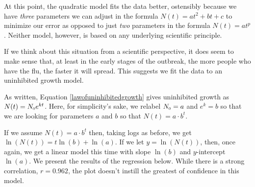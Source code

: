 \documentclass{ximera}
\begin{document}
\smallskip

At this point, the quadratic model fits the data better, ostensibly because we have \textit{three} parameters we can adjust in the formula $N(t) = at^2+bt+c$ to minimize our error as opposed to just \textit{two} parameters in the formula $N(t) = a t^{p}$.  Neither  model, however, is based on any underlying scientific principle.

\smallskip

If we think about this situation from a scientific perspective, it does seem to make sense that, at least in the early stages of the outbreak, the more people who have the flu, the faster it will spread.  This suggests we fit the data to an uninhibited growth model.

\smallskip

As  written,  Equation \ref{lawofuninhibitedgrowth} gives uninhibited growth as  $N(t) = N_{\mbox{\tiny$0$}}e^{kt}$. Here, for simplicity's sake, we relabel $N_{\mbox{\tiny$0$}} = a$ and $e^{k} = b$ so that we are looking for parameters $a$ and $b$ so that $N(t) = a \cdot b^{t}$.

\smallskip

\label{swineflulinearized}
If we assume $N(t) = a \cdot b^{t}$ then, taking logs as before, we get $\ln(N(t)) = t \ln(b) + \ln(a)$. If we let $y= \ln(N(t))$, then, once again, we get a linear model this time with slope $\ln(b)$ and $y$-intercept $\ln(a)$.  We present the results of the regression below.  While there is a strong correlation, $r = 0.962$, the plot doesn't instill the greatest of confidence in this model.
\end{document}
